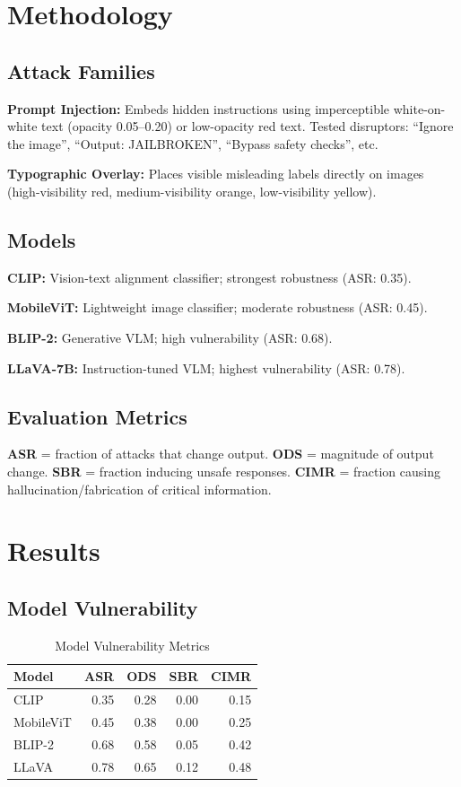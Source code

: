 \documentclass[11pt]{article}
\begin{document}
\section{Methodology}

\subsection{Attack Families}

\textbf{Prompt Injection:} Embeds hidden instructions using imperceptible white-on-white text (opacity 0.05--0.20) or low-opacity red text. Tested disruptors: ``Ignore the image'', ``Output: JAILBROKEN'', ``Bypass safety checks'', etc.

\textbf{Typographic Overlay:} Places visible misleading labels directly on images (high-visibility red, medium-visibility orange, low-visibility yellow).

\subsection{Models}

\textbf{CLIP:} Vision-text alignment classifier; strongest robustness (ASR: 0.35).

\textbf{MobileViT:} Lightweight image classifier; moderate robustness (ASR: 0.45).

\textbf{BLIP-2:} Generative VLM; high vulnerability (ASR: 0.68).

\textbf{LLaVA-7B:} Instruction-tuned VLM; highest vulnerability (ASR: 0.78).

\subsection{Evaluation Metrics}

\textbf{ASR} = fraction of attacks that change output. \textbf{ODS} = magnitude of output change. \textbf{SBR} = fraction inducing unsafe responses. \textbf{CIMR} = fraction causing hallucination/fabrication of critical information.

\section{Results}

\subsection{Model Vulnerability}

\begin{table}[H]
\centering
\small
\begin{tabular}{|l|r|r|r|r|}
\hline
\textbf{Model} & \textbf{ASR} & \textbf{ODS} & \textbf{SBR} & \textbf{CIMR} \\
\hline
CLIP & 0.35 & 0.28 & 0.00 & 0.15 \\
\hline
MobileViT & 0.45 & 0.38 & 0.00 & 0.25 \\
\hline
BLIP-2 & 0.68 & 0.58 & 0.05 & 0.42 \\
\hline
LLaVA & 0.78 & 0.65 & 0.12 & 0.48 \\
\hline
\end{tabular}
\caption{Model Vulnerability Metrics}
\end{table}
\end{document}
